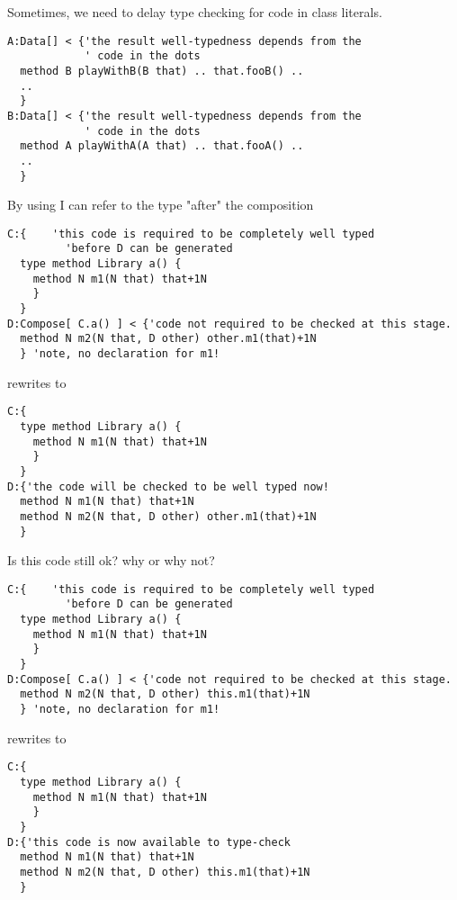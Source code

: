 \begin{frame}[fragile]
Sometimes, we need to delay type checking for code in class literals.
\begin{NiceCode}{59ex}{0.8}
\begin{lstlisting}
A:Data[] < {'the result well-typedness depends from the
            ' code in the dots
  method B playWithB(B that) .. that.fooB() .. 
  ..
  }         
B:Data[] < {'the result well-typedness depends from the
            ' code in the dots
  method A playWithA(A that) .. that.fooA() ..  
  ..
  }         
\end{lstlisting}
\end{NiceCode}
\end{frame}

\begin{frame}[fragile]
By using \Q@D@ I can refer to the type "after" the composition
\begin{NiceCode}{59ex}{0.8}
\begin{lstlisting}
C:{    'this code is required to be completely well typed 
         'before D can be generated
  type method Library a() {
    method N m1(N that) that+1N
    }
  }
D:Compose[ C.a() ] < {'code not required to be checked at this stage.
  method N m2(N that, D other) other.m1(that)+1N
  } 'note, no declaration for m1!
\end{lstlisting}
\end{NiceCode}
rewrites to 

\begin{NiceCode}{59ex}{0.8}
\begin{lstlisting}
C:{
  type method Library a() {
    method N m1(N that) that+1N
    }
  }
D:{'the code will be checked to be well typed now!
  method N m1(N that) that+1N
  method N m2(N that, D other) other.m1(that)+1N
  }   
\end{lstlisting}
\end{NiceCode}
\end{frame}


\begin{frame}[fragile]
Is this code still ok? why or why not?
\begin{NiceCode}{59ex}{0.8}
\begin{lstlisting}
C:{    'this code is required to be completely well typed 
         'before D can be generated
  type method Library a() {
    method N m1(N that) that+1N
    }
  }
D:Compose[ C.a() ] < {'code not required to be checked at this stage.
  method N m2(N that, D other) this.m1(that)+1N
  } 'note, no declaration for m1!
\end{lstlisting}
\end{NiceCode}
rewrites to 

\begin{NiceCode}{59ex}{0.8}
\begin{lstlisting}
C:{
  type method Library a() {
    method N m1(N that) that+1N
    }
  }
D:{'this code is now available to type-check
  method N m1(N that) that+1N
  method N m2(N that, D other) this.m1(that)+1N
  }   
\end{lstlisting}
\end{NiceCode}
\end{frame}


